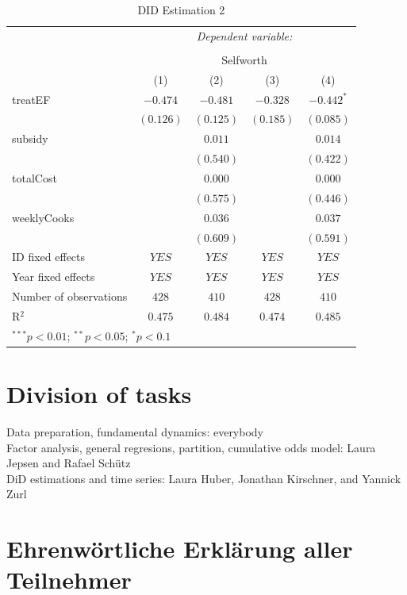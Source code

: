 \documentclass[12pt, a4paper, titlepage]{article}\usepackage[]{graphicx}\usepackage[]{color}
\begin{document}
\begin{table}
\begin{center}
\begin{tabular}{l c c c c}
& \multicolumn{4}{c}{\textit{Dependent variable:}} \\
\cline{2-5}
\\[-1.8ex] & \multicolumn{4}{c}{Selfworth} \\
\hline
 & (1) & (2) & (3) & (4) \\
\hline
treatEF                & $-0.474$  & $-0.481$  & $-0.328$  & $-0.442^{*}$ \\
                       & $(0.126)$ & $(0.125)$ & $(0.185)$ & $(0.085)$    \\
subsidy                &           & $0.011$   &           & $0.014$      \\
                       &           & $(0.540)$ &           & $(0.422)$    \\
totalCost              &           & $0.000$   &           & $0.000$      \\
                       &           & $(0.575)$ &           & $(0.446)$    \\
weeklyCooks            &           & $0.036$   &           & $0.037$      \\
                       &           & $(0.609)$ &           & $(0.591)$    \\
\hline
ID fixed effects       & $YES$     & $YES$     & $YES$     & $YES$        \\
Year fixed effects     & $YES$     & $YES$     & $YES$     & $YES$        \\
Number of observations & $428$     & $410$     & $428$     & $410$        \\
R$^2$                  & $0.475$   & $0.484$   & $0.474$   & $0.485$      \\
\hline
\multicolumn{5}{l}{\scriptsize{$^{***}p<0.01$; $^{**}p<0.05$; $^{*}p<0.1$}}
\end{tabular}
\caption{DID Estimation 2}
\label{table:coefficients4}
\end{center}
\end{table}


\section{Division of tasks}

Data preparation, fundamental dynamics: everybody\\
Factor analysis, general regresions, partition, cumulative odds model: Laura Jepsen and Rafael Schütz\\
DiD estimations and time series: Laura Huber, Jonathan Kirschner, and Yannick Zurl
\section{Ehrenwörtliche Erklärung aller Teilnehmer}
\end{document}
